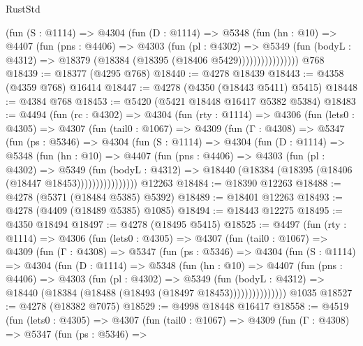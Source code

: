 \begin{lexlean}{RustStd}
\begin{coremodule}
                  (fun (S : @1114) =>
                  @4304
                    (fun (D : @1114) =>
                    @5348
                      (fun (hn : @10) =>
                      @4407
                        (fun (pns : @4406) =>
                        @4303
                          (fun (pl : @4302) =>
                          @5349
                            (fun (bodyL : @4312) =>
                            @18379 (@18384 (@18395 (@18406 @5429))))))))))))))))
    @768
@18439 := @18377 (@4295 @768)
@18440 := @4278 @18439
@18443 := @4358 (@4359 @768) @16414
@18447 := @4278 (@4350 (@18443 @5411) @5415)
@18448 := @4384 @768
@18453 := @5420 (@5421 @18448 @16417 @5382 @5384)
@18483 := @4494
    (fun (rc : @4302) =>
    @4304
      (fun (rty : @1114) =>
      @4306
        (fun (lets0 : @4305) =>
        @4307
          (fun (tail0 : @1067) =>
          @4309
            (fun (Γ : @4308) =>
            @5347
              (fun (ps : @5346) =>
              @4304
                (fun (S : @1114) =>
                @4304
                  (fun (D : @1114) =>
                  @5348
                    (fun (hn : @10) =>
                    @4407
                      (fun (pns : @4406) =>
                      @4303
                        (fun (pl : @4302) =>
                        @5349
                          (fun (bodyL : @4312) =>
                          @18440 (@18384 (@18395 (@18406 (@18447 @18453))))))))))))))))
    @12263
@18484 := @18390 @12263
@18488 := @4278 (@5371 (@18484 @5385) @5392)
@18489 := @18401 @12263
@18493 := @4278 (@4409 (@18489 @5385) @1085)
@18494 := @18443 @12275
@18495 := @4350 @18494
@18497 := @4278 (@18495 @5415)
@18525 := @4497
    (fun (rty : @1114) =>
    @4306
      (fun (lets0 : @4305) =>
      @4307
        (fun (tail0 : @1067) =>
        @4309
          (fun (Γ : @4308) =>
          @5347
            (fun (ps : @5346) =>
            @4304
              (fun (S : @1114) =>
              @4304
                (fun (D : @1114) =>
                @5348
                  (fun (hn : @10) =>
                  @4407
                    (fun (pns : @4406) =>
                    @4303
                      (fun (pl : @4302) =>
                      @5349
                        (fun (bodyL : @4312) =>
                        @18440 (@18384 (@18488 (@18493 (@18497 @18453)))))))))))))))
    @1035
@18527 := @4278 (@18382 @7075)
@18529 := @4998 @18448 @16417
@18558 := @4519
    (fun (lets0 : @4305) =>
    @4307
      (fun (tail0 : @1067) =>
      @4309
        (fun (Γ : @4308) =>
        @5347
          (fun (ps : @5346) =>

\end{coremodule}
\end{lexlean}

